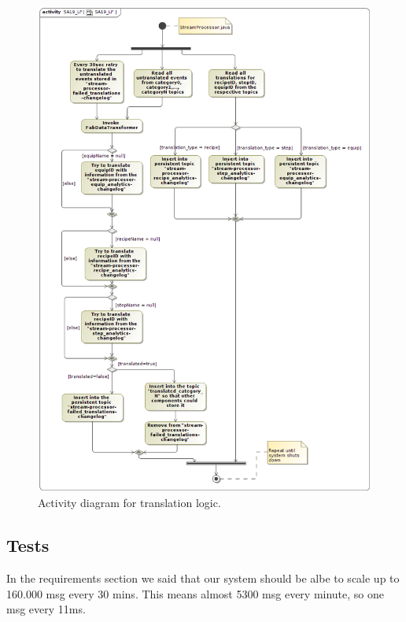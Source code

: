  \begin{figure}[H]
 \includegraphics[width=\textwidth, scale=0.7]{img/activity.png}
\caption{Activity diagram for translation logic.}
\end{figure}

\subsection{Tests}
In the requirements section we said that our system should be albe to scale up to 160.000 msg every 30 mins. This means almost 5300 msg every minute, so one msg every 11ms.

